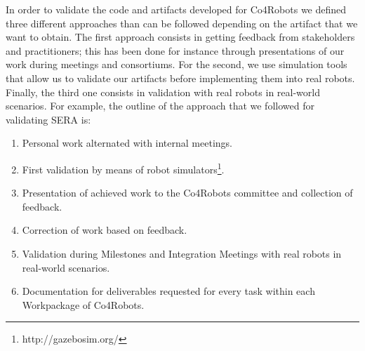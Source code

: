 
In order to validate the code and artifacts developed for Co4Robots we defined three different approaches than can be followed depending on the artifact that we want to obtain.
The first approach consists in getting feedback from stakeholders and practitioners; this has been done for instance through presentations of our work during meetings and consortiums.
For the second, we use simulation tools that allow us to validate our artifacts before implementing them into real robots.
Finally, the third one consists in validation with real robots in real-world scenarios.
For example, the outline of the approach that we followed for validating SERA is:
\begin{enumerate}
\item Personal work alternated with internal meetings.
\item First validation by means of robot simulators\footnote{http://gazebosim.org/}.
\item Presentation of achieved work to the Co4Robots committee and collection of feedback.
\item Correction of work based on feedback.
\item Validation during Milestones and Integration Meetings with real robots in real-world scenarios.
\item Documentation for deliverables requested for every task within each Workpackage of Co4Robots.
\end{enumerate}




